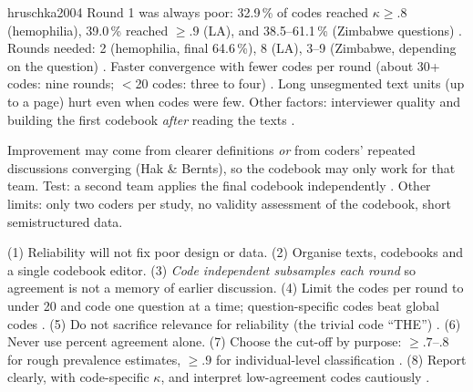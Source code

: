 \begin{papercard}{hruschka2004}
 Round 1 was always poor: 32.9\,\% of codes reached $\kappa\ge.8$ (hemophilia), 39.0\,\% reached $\ge.9$ (LA), and 38.5--61.1\,\% (Zimbabwe questions) . Rounds needed: 2 (hemophilia, final 64.6\,\%), 8 (LA), 3--9 (Zimbabwe, depending on the question) . Faster convergence with fewer codes per round (about 30+ codes: nine rounds; $<$20 codes: three to four) . Long unsegmented text units (up to a page) hurt even when codes were few. Other factors: interviewer quality and building the first codebook \emph{after} reading the texts .

 Improvement may come from clearer definitions \emph{or} from coders' repeated discussions converging (Hak \& Bernts), so the codebook may only work for that team. Test: a second team applies the final codebook independently . Other limits: only two coders per study, no validity assessment of the codebook, short semistructured data.

 (1) Reliability will not fix poor design or data. (2) Organise texts, codebooks and a single codebook editor. (3) \emph{Code independent subsamples each round} so agreement is not a memory of earlier discussion. (4) Limit the codes per round to under 20 and code one question at a time; question-specific codes beat global codes . (5) Do not sacrifice relevance for reliability (the trivial code ``THE'') . (6) Never use percent agreement alone. (7) Choose the cut-off by purpose: $\ge.7$--$.8$ for rough prevalence estimates, $\ge.9$ for individual-level classification . (8) Report clearly, with code-specific $\kappa$, and interpret low-agreement codes cautiously .


\end{papercard}
